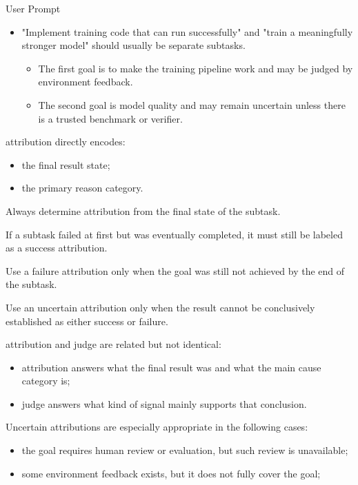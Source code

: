 \documentclass{llmxive}
\providecommand{\svpromptsubheading}[1]{\par\smallskip\noindent{\sffamily\bfseries #1}\par}
\providecommand{\svinlinecode}[1]{{\ttfamily #1}}
\begin{document}
\begin{svpromptbox}{User Prompt}
\begin{itemize}
\begin{itemize}
\end{itemize}
\item "Implement training code that can run successfully" and "train a meaningfully stronger model" should usually be separate subtasks.
\begin{itemize}
\item The first goal is to make the training pipeline work and may be judged by environment feedback.
\item The second goal is model quality and may remain uncertain unless there is a trusted benchmark or verifier.
\end{itemize}
\end{itemize}
\smallskip
\svpromptsubheading{Attribution}
\smallskip
\svinlinecode{attribution} directly encodes:\par
\smallskip
\begin{itemize}
\item the final result state;
\item the primary reason category.
\end{itemize}
\smallskip
Always determine attribution from the final state of the subtask.\par
\smallskip
If a subtask failed at first but was eventually completed, it must still be labeled as a success attribution.\par
\smallskip
Use a failure attribution only when the goal was still not achieved by the end of the subtask.\par
\smallskip
Use an uncertain attribution only when the result cannot be conclusively established as either success or failure.\par
\smallskip
\svinlinecode{attribution} and \svinlinecode{judge} are related but not identical:\par
\smallskip
\begin{itemize}
\item \svinlinecode{attribution} answers what the final result was and what the main cause category is;
\item \svinlinecode{judge} answers what kind of signal mainly supports that conclusion.
\end{itemize}
\smallskip
Uncertain attributions are especially appropriate in the following cases:\par
\smallskip
\begin{itemize}
\item the goal requires human review or evaluation, but such review is unavailable;
\item some environment feedback exists, but it does not fully cover the goal;

\end{itemize}
\end{svpromptbox}
\end{document}
